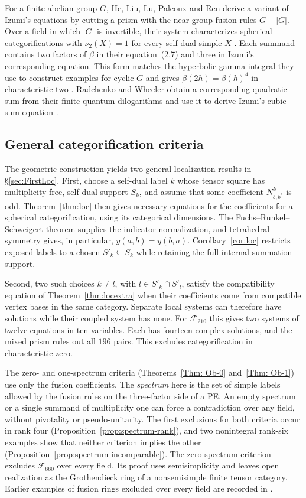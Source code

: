 \documentclass{amsart}
\begin{document}
For a finite abelian group $G$, He, Liu, Lu, Palcoux and Ren derive a variant of Izumi's equations by cutting a prism with the near-group fusion rules $G+|G|$. Over a field in which $|G|$ is invertible, their system characterizes spherical categorifications with $\nu_2(X)=1$ for every self-dual simple $X$ \cite[Theorem~2.3 and Remark~2.4]{LLPRnear}. Each summand contains two factors of $\beta$ in their equation~(2.7) and three in Izumi's corresponding equation. This form matches the hyperbolic gamma integral they use to construct examples for cyclic $G$ and gives $\beta(2h)=\beta(h)^4$ in characteristic two \cite[Remarks~2.2 and~2.6 and \S2.2]{LLPRnear}. Radchenko and Wheeler obtain a corresponding quadratic sum from their finite quantum dilogarithms and use it to derive Izumi's cubic-sum equation \cite[Theorem~2 and \S5.4]{RW26}.

\subsection*{General categorification criteria}
The geometric construction yields two general localization results in \S\ref{sec:FirstLoc}. First, choose a self-dual label $k$ whose tensor square has multiplicity-free, self-dual support $S_k$, and assume that some coefficient $N_{b,b^*}^k$ is odd. Theorem~\ref{thm:loc} then gives necessary equations for the coefficients for a spherical categorification, using its categorical dimensions. The Fuchs--Runkel--Schweigert theorem supplies the indicator normalization, and tetrahedral symmetry gives, in particular, $y(a,b)=y(b,a)$. Corollary~\ref{cor:loc} restricts exposed labels to a chosen $S'_k\subseteq S_k$ while retaining the full internal summation support.

Second, two such choices $k\ne l$, with $l\in S'_k\cap S'_l$, satisfy the compatibility equation of Theorem~\ref{thm:locextra} when their coefficients come from compatible vertex bases in the same category. Separate local systems can therefore have solutions while their coupled system has none. For $\mathcal F_{210}$ this gives two systems of twelve equations in ten variables. Each has fourteen complex solutions, and the mixed prism rules out all $196$ pairs. This excludes categorification in characteristic zero.

The zero- and one-spectrum criteria (Theorems~\ref{Thm: Ob-0} and~\ref{Thm: Ob-1}) use only the fusion coefficients. The \emph{spectrum} here is the set of simple labels allowed by the fusion rules on the three-factor side of a PE. An empty spectrum or a single summand of multiplicity one can force a contradiction over any field, without pivotality or pseudo-unitarity. The first exclusions for both criteria occur in rank four (Proposition~\ref{prop:spectrum-rank}), and two nonintegral rank-six examples show that neither criterion implies the other (Proposition~\ref{prop:spectrum-incomparable}). The zero-spectrum criterion excludes $\mathcal F_{660}$ over every field. Its proof uses semisimplicity and leaves open realization as the Grothendieck ring of a nonsemisimple finite tensor category. Earlier examples of fusion rings excluded over every field are recorded in \cite[\S5.2]{LPRmult1}.
\end{document}
